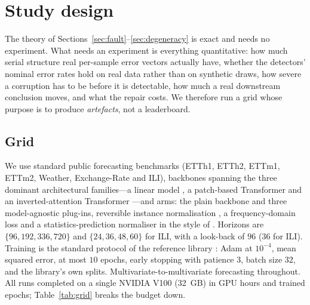 \documentclass[a4paper,fleqn]{cas-sc}
\newcommand{\fitwidth}[1]{%
  \resizebox{\ifdim\width>\linewidth \linewidth\else \width\fi}{!}{#1}}
\begin{document}
\section{Study design}
\label{sec:design}

The theory of Sections~\ref{sec:fault}--\ref{sec:degeneracy} is exact and needs no
experiment. What needs an experiment is everything quantitative: how much serial
structure real per-sample error vectors actually have, whether the detectors'
nominal error rates hold on real data rather than on synthetic draws, how severe a
corruption has to be before it is detectable, how much a real downstream
conclusion moves, and what the repair costs. We therefore run a grid whose purpose
is to produce \emph{artefacts}, not a leaderboard.

\subsection{Grid}

We use \NumDatasets{} standard public forecasting benchmarks (ETTh1, ETTh2, ETTm1,
ETTm2, Weather, Exchange-Rate and ILI), \NumBackbones{} backbones spanning the
three dominant architectural families---a linear model \citep{zeng2023dlinear}, a
patch-based Transformer \citep{nie2023patchtst} and an inverted-attention
Transformer \citep{liu2024itransformer}---and \NumArms{} arms: the plain backbone
and three model-agnostic plug-ins, reversible instance normalisation
\citep{kim2022revin}, a frequency-domain loss \citep{wang2024fredf} and a
statistics-prediction normaliser in the style of \citet{liu2023san}. Horizons are
$\{96,192,336,720\}$ and $\{24,36,48,60\}$ for ILI, with a look-back of $96$ ($36$
for ILI). Training is the standard protocol of the reference library
\citep{tslib}: Adam at $10^{-4}$, mean squared error, at most $10$ epochs, early
stopping with patience $3$, batch size $32$, and the library's own splits.
Multivariate-to-multivariate forecasting throughout. All \NumRuns{} runs
completed on a single NVIDIA V100 (32~GB) in \NumGpuHours{} GPU hours and
\NumTrainedEpochs{} trained epochs; Table~\ref{tab:grid} breaks the budget down.

\begin{table}[t]
\centering
\caption{The grid. Every cell is one training run; \emph{arms} counts the plain
backbone plus the plug-ins. Generated from \texttt{artifacts/runs.csv}.}
\label{tab:grid}
\fitwidth{}
\end{table}
\end{document}
